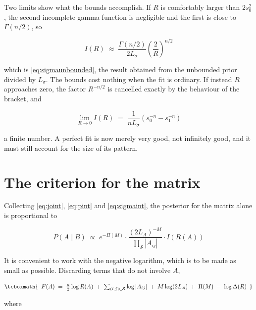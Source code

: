 Two limits show what the bounds accomplish. If $R$ is comfortably larger than
$2 s_{0}^{2}$, the second incomplete gamma function is negligible and the first is
close to $\Gamma(n/2)$, so

\begin{equation}
I(R) \;\approx\; \frac{\Gamma(n/2)}{2 L_{\sigma}}
\left( \frac{2}{R} \right)^{n/2}
\label{eq:sigmaordinary}
\end{equation}

which is \eqref{eq:sigmaunbounded}, the result obtained from the unbounded prior
divided by $L_{\sigma}$. The bounds cost nothing when
the fit is ordinary. If instead $R$ approaches zero, the factor $R^{-n/2}$ is
cancelled exactly by the behaviour of the bracket, and

\begin{equation}
\lim_{R \to 0} I(R) \;=\; \frac{1}{n L_{\sigma}}
\left( s_{0}^{-n} - s_{1}^{-n} \right)
\label{eq:sigmalimit}
\end{equation}

a finite number. A perfect fit is now merely very good, not infinitely good, and it
must still account for the size of its pattern.

\section{The criterion for the matrix}
\label{sec:criterion}

Collecting \eqref{eq:joint}, \eqref{eq:pint} and \eqref{eq:sigmaint}, the posterior
for the matrix alone is proportional to

\begin{equation}
P(A \mid B) \;\propto\;
e^{-\Pi(M)}
\cdot \frac{(2L_{A})^{-M}}{\prod_{\mathcal{S}} |A_{ij}|}
\cdot I\!\left( R(A) \right)
\label{eq:posteriorA}
\end{equation}

It is convenient to work with the negative logarithm, which is to be made as small as
possible. Discarding terms that do not involve $A$,

\begin{equation}
\tcboxmath{ \begin{array}[t]{c}
F(A) \;=\;
\frac{n}{2} \log R(A)
\;+\; \sum_{(i,j) \in \mathcal{S}} \log |A_{ij}|
\;+\; M \log (2 L_{A})
\;+\; \Pi(M)
\;-\; \log \Delta(R)
\end{array}}
\label{eq:criterion}
\end{equation}

where

